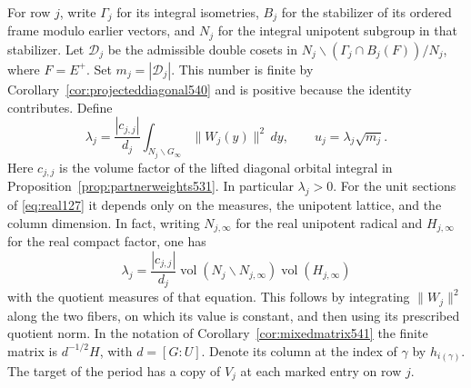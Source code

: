\documentclass[a4paper,11pt]{article}
\theoremstyle{definition}
\theoremstyle{remark}
\numberwithin{equation}{section}
\begin{document}
For row \(j\), write \(\Gamma_j\) for its integral isometries,
\(B_j\) for the stabilizer of its ordered frame modulo earlier
vectors, and \(N_j\) for the integral unipotent subgroup in that
stabilizer. Let \(\mathcal D_j\) be the admissible double cosets
in \(N_j\backslash(\Gamma_j\cap B_j(F))/N_j\), where \(F=E^+\).
Set \(m_j=|\mathcal D_j|\). This number is finite by
Corollary~\ref{cor:projecteddiagonal540} and is positive because
the identity contributes. Define
\[
        \lambda_j=\frac{|c_{j,j}|}{d_j}
                \int_{N_j\backslash G_\infty}\|W_j(y)\|^2\,dy,
        \qquad u_j=\lambda_j\sqrt{m_j}.
\]
Here \(c_{j,j}\) is the volume factor of the lifted diagonal
orbital integral in Proposition~\ref{prop:partnerweights531}.
In particular \(\lambda_j>0\). For the unit sections of
\eqref{eq:real127} it depends only on the measures, the
unipotent lattice, and the column dimension. In fact, writing
\(N_{j,\infty}\) for the real unipotent radical and
\(H_{j,\infty}\) for the real compact factor, one has
\[
     \lambda_j=
       \frac{|c_{j,j}|}{d_j}
       \operatorname{vol}(N_j\backslash N_{j,\infty})
       \operatorname{vol}(H_{j,\infty})
\]
with the quotient measures of that equation. This follows by
integrating \(\|W_j\|^2\) along the two fibers, on which its value
is constant, and then using its prescribed quotient norm.
In the notation of
Corollary~\ref{cor:mixedmatrix541} the finite matrix is
\(d^{-1/2}H\), with \(d=[G:U]\). Denote its column at the
index of \(\gamma\) by \(h_{i(\gamma)}\). The target of the
period has a copy of \(V_j\) at each marked entry on row \(j\).
\end{document}
